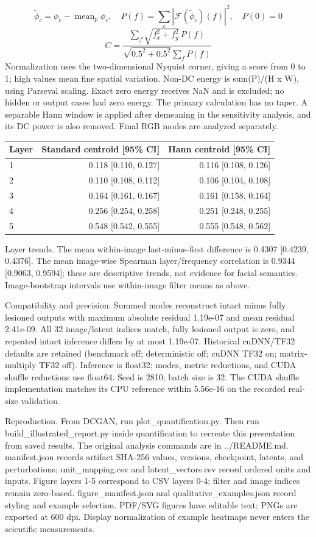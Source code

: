 \documentclass[10pt,a4paper]{article}
\begin{document}
\[\widetilde{\phi}_c=\phi_c-\operatorname{mean}_p\phi_c,\quad P(f)=\sum_c|\mathcal{F}(\widetilde{\phi}_c)(f)|^2,\quad P(0)=0\]
\[C=\frac{\sum_f \sqrt{f_x^2+f_y^2}\,P(f)}{\sqrt{0.5^2+0.5^2}\sum_fP(f)}\]
Normalization uses the two-dimensional Nyquist corner, giving a score from 0 to 1; high values mean fine spatial variation. Non-DC energy is sum(P)/(H x W), using Parseval scaling. Exact zero energy receives NaN and is excluded; no hidden or output cases had zero energy. The primary calculation has no taper. A separable Hann window is applied after demeaning in the sensitivity analysis, and its DC power is also removed. Final RGB modes are analyzed separately.

\begin{center}{\small\begin{tabular}{lrr}\toprule
Layer & Standard centroid [95\% CI] & Hann centroid [95\% CI] \\ \midrule
1 & 0.118 [0.110, 0.127] & 0.116 [0.108, 0.126] \\
2 & 0.110 [0.108, 0.112] & 0.106 [0.104, 0.108] \\
3 & 0.164 [0.161, 0.167] & 0.161 [0.158, 0.164] \\
4 & 0.256 [0.254, 0.258] & 0.251 [0.248, 0.255] \\
5 & 0.548 [0.542, 0.555] & 0.555 [0.548, 0.562] \\
\bottomrule\end{tabular}}\end{center}
Layer trends. The mean within-image last-minus-first difference is 0.4307 [0.4239, 0.4376]. The mean image-wise Spearman layer/frequency correlation is 0.9344 [0.9063, 0.9594]; these are descriptive trends, not evidence for facial semantics. Image-bootstrap intervals use within-image filter means as above.

Compatibility and precision. Summed modes reconstruct intact minus fully lesioned outputs with maximum absolute residual 1.19e-07 and mean residual 2.41e-09. All 32 image/latent indices match, fully lesioned output is zero, and repeated intact inference differs by at most 1.19e-07. Historical cuDNN/TF32 defaults are retained (benchmark off; deterministic off; cuDNN TF32 on; matrix-multiply TF32 off). Inference is float32; modes, metric reductions, and CUDA shuffle reductions use float64. Seed is 2810; batch size is 32. The CUDA shuffle implementation matches its CPU reference within 5.56e-16 on the recorded real-size validation.

Reproduction. From DCGAN, run plot\_quantification.py. Then run build\_illustrated\_report.py inside quantification to recreate this presentation from saved results. The original analysis commands are in ../README.md. manifest.json records artifact SHA-256 values, versions, checkpoint, latents, and perturbations; unit\_mapping.csv and latent\_vectors.csv record ordered units and inputs. Figure layers 1-5 correspond to CSV layers 0-4; filter and image indices remain zero-based. figure\_manifest.json and qualitative\_examples.json record styling and example selection. PDF/SVG figures have editable text; PNGs are exported at 600 dpi. Display normalization of example heatmaps never enters the scientific measurements.
\end{document}
